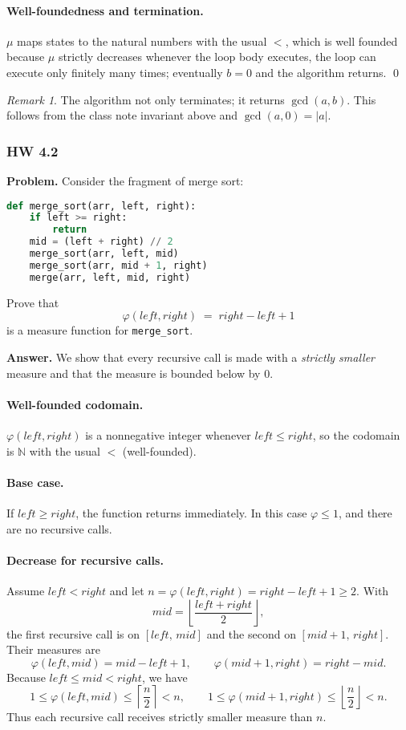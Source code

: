 \documentclass{article}
\theoremstyle{theorem}
\theoremstyle{definition}
\theoremstyle{remark}
\newtheorem{remark}[theorem]{Remark}
\begin{document}
\paragraph{Well-foundedness and termination.}
$\mu$ maps states to the natural numbers with the usual $<$, which is well founded  because $\mu$ strictly decreases whenever the loop body executes, the loop can execute only finitely many times; eventually $b=0$ and the algorithm returns. \qed

\begin{remark}
The algorithm not only terminates; it returns $\gcd(a,b)$. This follows from the class note invariant above and $\gcd(a,0)=|a|$.
\end{remark}

\subsubsection*{HW 4.2}
\textbf{Problem.} Consider the fragment of merge sort:
\begin{lstlisting}[language=Python]
def merge_sort(arr, left, right):
    if left >= right:
        return
    mid = (left + right) // 2
    merge_sort(arr, left, mid)
    merge_sort(arr, mid + 1, right)
    merge(arr, left, mid, right)
\end{lstlisting}
Prove that
\[
\varphi(left,right) \;=\; right - left + 1
\]
is a measure function for \texttt{merge\_sort}.

\medskip
\textbf{Answer.}
We show that every recursive call is made with a \emph{strictly smaller} measure and that the measure is bounded below by $0$.

\paragraph{Well-founded codomain.}
$\varphi(left,right)$ is a nonnegative integer whenever $left\le right$, so the codomain is $\mathbb{N}$ with the usual $<$ (well-founded).

\paragraph{Base case.}
If $left \ge right$, the function returns immediately. In this case $\varphi \le 1$, and there are no recursive calls.

\paragraph{Decrease for recursive calls.}
Assume $left < right$ and let $n = \varphi(left,right) = right-left+1 \ge 2$. With
\[
mid = \left\lfloor \frac{left+right}{2} \right\rfloor,
\]
the first recursive call is on $[left,\,mid]$ and the second on $[mid+1,\,right]$. Their measures are
\[
\varphi(left,mid) = mid - left + 1, \qquad
\varphi(mid+1,right) = right - mid.
\]
Because $left \le mid < right$, we have
\[
1 \le \varphi(left,mid) \le \left\lceil \frac{n}{2}\right\rceil < n,\qquad
1 \le \varphi(mid+1,right) \le \left\lfloor \frac{n}{2}\right\rfloor < n.
\]
Thus each recursive call receives strictly smaller measure than $n$.
\end{document}
